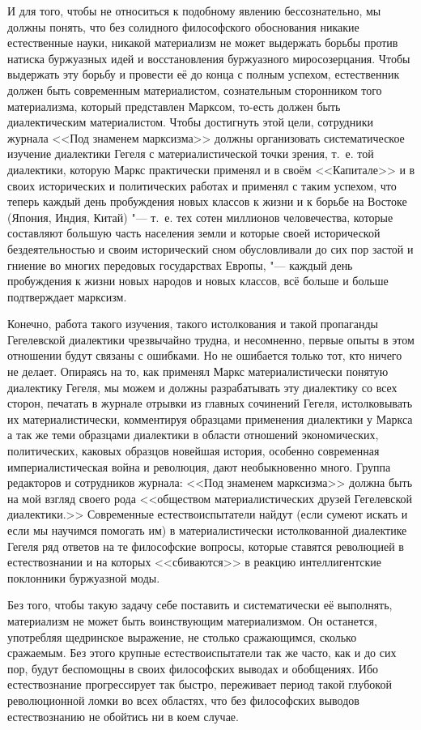 И для того, чтобы не относиться к подобному явлению бессознательно, мы
должны понять, что без солидного философского обоснования никакие
естественные науки, никакой материализм не может выдержать борьбы против
натиска буржуазных идей и восстановления буржуазного миросозерцания. Чтобы
выдержать эту борьбу и провести её до конца с полным успехом, естественник
должен быть современным материалистом, сознательным сторонником того
материализма, который представлен Марксом, то-есть должен быть
диалектическим материалистом. Чтобы достигнуть этой цели, сотрудники
журнала <<Под знаменем марксизма>> должны организовать систематическое
изучение диалектики Гегеля с материалистической точки зрения, т.~е. той
диалектики, которую Маркс практически применял и в своём <<Капитале>> и в
своих исторических и политических работах и применял с таким успехом, что
теперь каждый день пробуждения новых классов к жизни и к борьбе на Востоке
(Япония, Индия, Китай) "--- т.~е. тех сотен миллионов человечества, которые
составляют большую часть населения земли и которые своей исторической
бездеятельностью и своим исторический сном обусловливали до сих пор застой
и гниение во многих передовых государствах Европы, "--- каждый день
пробуждения к жизни новых народов и новых классов, всё больше и больше
подтверждает марксизм.

Конечно, работа такого изучения, такого истолкования и такой пропаганды
Гегелевской диалектики чрезвычайно трудна, и несомненно, первые опыты в
этом отношении будут связаны с ошибками. Но не ошибается только тот, кто
ничего не делает. Опираясь на то, как применял Маркс материалистически
понятую диалектику Гегеля, мы можем и должны разрабатывать эту диалектику
со всех сторон, печатать в журнале отрывки из главных сочинений Гегеля,
истолковывать их материалистически, комментируя образцами применения
диалектики у Маркса а так же теми образцами диалектики в области отношений
экономических, политических, каковых образцов новейшая история, особенно
современная империалистическая война и революция, дают необыкновенно много.
Группа редакторов и сотрудников журнала: <<Под знаменем марксизма>> должна
быть на мой взгляд своего рода <<обществом материалистических друзей
Гегелевской диалектики.>> Современные естествоиспытатели найдут (если сумеют
искать и если мы научимся помогать им) в материалистически истолкованной
диалектике Гегеля ряд ответов на те философские вопросы, которые ставятся
революцией в естествознании и на которых <<сбиваются>> в реакцию
интеллигентские поклонники буржуазной моды.

Без того, чтобы такую задачу себе поставить и систематически её выполнять,
материализм не может быть воинствующим материализмом. Он останется,
употребляя щедринское выражение, не столько сражающимся, сколько сражаемым.
Без этого крупные естествоиспытатели так же часто, как и до сих пор, будут
беспомощны в своих философских выводах и обобщениях. Ибо естествознание
прогрессирует так быстро, переживает период такой глубокой революционной
ломки во всех областях, что без философских выводов естествознанию не
обойтись ни в коем случае.

